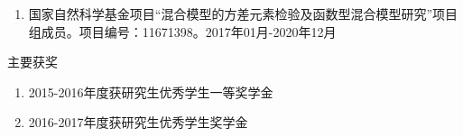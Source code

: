 \begin{enumerate}
\tightlist
\item 国家自然科学基金项目“混合模型的方差元素检验及函数型混合模型研究”项目组成员。项目编号：11671398。2017年01月-2020年12月
\end{enumerate}

\begin{center}
{\kaishu {} 主要获奖}
\end{center}

\begin{enumerate}
\tightlist
\item 2015-2016年度获研究生优秀学生一等奖学金
\item 2016-2017年度获研究生优秀学生奖学金
\end{enumerate}


\appendix %
% 
% 





\backmatter
